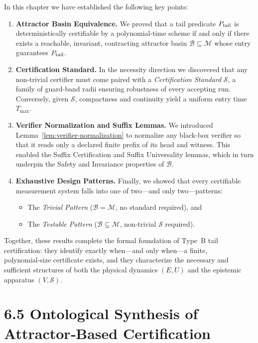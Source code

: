 \documentclass[12pt]{article}
\theoremstyle{definition}
\theoremstyle{plain}
\begin{document}
In this chapter we have established the following key points:

\begin{enumerate}
  \item \textbf{Attractor Basin Equivalence.}  We proved that a tail predicate $P_{\rm tail}$ is deterministically certifiable by a polynomial‑time scheme if and only if there exists a reachable, invariant, contracting attractor basin $\mathcal B\subseteq\mathcal M$ whose entry guarantees $P_{\rm tail}$.  
  \item \textbf{Certification Standard.}  In the necessity direction we discovered that any non‑trivial certifier must come paired with a \emph{Certification Standard} $\mathcal S$, a family of guard‐band radii ensuring robustness of every accepting run.  Conversely, given $\mathcal S$, compactness and continuity yield a uniform entry time $T_{\max}$.  
  \item \textbf{Verifier Normalization and Suffix Lemmas.}  We introduced Lemma~\ref{lem:verifier-normalization} to normalize any black‑box verifier so that it reads only a declared finite prefix of its head and witness.  This enabled the Suffix Certification and Suffix Universality lemmas, which in turn underpin the Safety and Invariance properties of $\mathcal B$.  
  \item \textbf{Exhaustive Design Patterns.}  Finally, we showed that every certifiable measurement system falls into one of two—and only two—patterns:
  \begin{itemize}
    \item The \emph{Trivial Pattern} ($\mathcal B=\mathcal M$, no standard required), and
    \item The \emph{Testable Pattern} ($\mathcal B\subsetneq\mathcal M$, non‑trivial $\mathcal S$ required).
  \end{itemize}
\end{enumerate}

Together, these results complete the formal foundation of Type B tail certification: they identify exactly when—and only when—a finite, polynomial‑size certificate exists, and they characterize the necessary and sufficient structures of both the physical dynamics $(E,U)$ and the epistemic apparatus $(V,\mathcal S)$. 

\section*{6.5 Ontological Synthesis of Attractor‑Based Certification}
\end{document}
